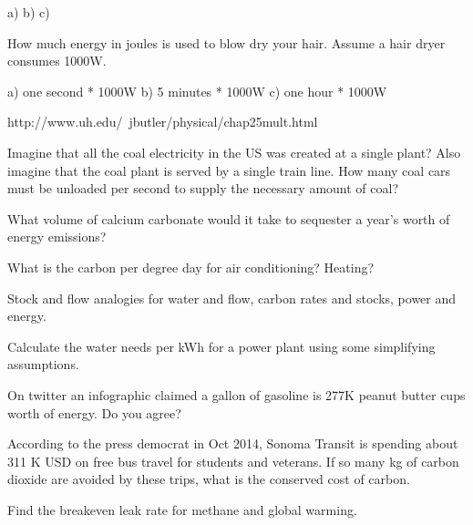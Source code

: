 \documentclass[12pt, oneside]{article}
\begin{document}
a)
b)
c)

\problem{}
How much energy in joules is used to blow dry your hair.  Assume a hair
dryer consumes 1000W.

a) one second * 1000W
b) 5 minutes * 1000W
c) one hour * 1000W


http://www.uh.edu/~jbutler/physical/chap25mult.html

\problem{}
Imagine that all the coal electricity in the US was created at a single
plant?  Also imagine that the coal plant is served by a single train
line.  How many coal cars must be unloaded per second to supply the
necessary amount of coal?

\solution{
}

\problem{}
What volume of calcium carbonate would it take to sequester a year's
worth of energy emissions?

\problem{}
What is the carbon per degree day for air conditioning?  Heating?

\problem{}
Stock and flow analogies for water and flow, carbon rates and stocks,
power and energy.

\problem{}
Calculate the water needs per kWh for a power plant using some
simplifying assumptions.

\problem{}
On twitter an infographic claimed a gallon of gasoline is 277K peanut
butter cups worth of energy.  Do you agree?


\problem{}
According to the press democrat in Oct 2014, Sonoma Transit is spending
about 311 K USD on free bus travel for students and veterans.  If so
many kg of carbon dioxide are avoided by these trips, what is the
conserved cost of carbon.

\problem{}

Find the breakeven leak rate for methane and global warming.

\end{document}
